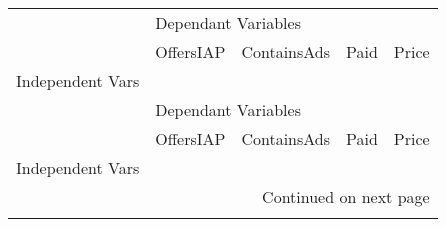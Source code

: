 \begin{longtable}[h!]{lllll}
\toprule
{} & \multicolumn{4}{l}{Dependant Variables} \\
{} &           OffersIAP & ContainsAds &       Paid &      Price \\
Independent Vars &                     &             &            &            \\
\midrule
\endfirsthead

\toprule
{} & \multicolumn{4}{l}{Dependant Variables} \\
{} &           OffersIAP & ContainsAds &       Paid &      Price \\
Independent Vars &                     &             &            &            \\
\midrule
\endhead
\midrule
\multicolumn{5}{r}{{Continued on next page}} \\
\midrule
\endfoot


\end{longtable}
